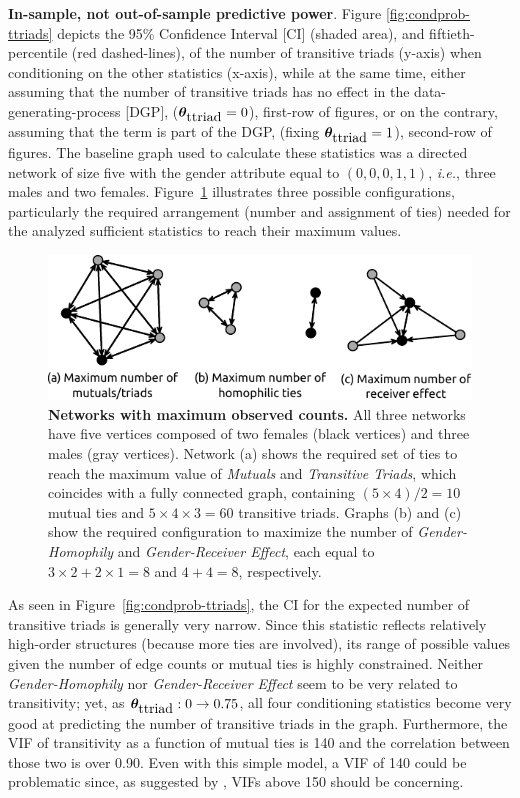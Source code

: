 \documentclass[12pt]{article}
\begin{document}
\noindent \textbf{In-sample, not out-of-sample predictive power}. Figure \ref{fig:condprob-ttriads} depicts the 95\% Confidence Interval [CI] (shaded area), and fiftieth-percentile (red dashed-lines), of the number of transitive triads (y-axis) when conditioning on the other statistics (x-axis), while at the same time, either assuming that the number of transitive triads has no effect in the data-generating-process [DGP], ($\bm{\theta}_{\mbox{ttriad}} = 0$), first-row of figures, or on the contrary, assuming that the term is part of the DGP, (fixing $\bm{\theta}_{\mbox{ttriad}}= 1$), second-row of figures. The baseline graph used to calculate these statistics was a directed network of size five with the gender attribute equal to $(0,0,0,1,1)$, \textit{i.e.}, three males and two females. Figure~\ref{fig:maxout-gof} illustrates three possible configurations, particularly the required arrangement (number and assignment of ties) needed for the analyzed sufficient statistics to reach their maximum values.

\begin{figure}[]
    \centering
    \includegraphics[width = .7\linewidth]{max-out-stats.pdf}
    \caption[Examples of Networks with the maximum observed counts]{\textbf{Networks with maximum observed counts.} All three networks have five vertices composed of two females (black vertices) and three males (gray vertices).
    Network (a) shows the required set of ties to reach the maximum value of \textit{Mutuals} and \textit{Transitive Triads}, which coincides with a fully connected graph, containing $(5\times 4)/2 = 10$ mutual ties and $5 \times 4 \times 3 = 60$ transitive triads.
    Graphs (b) and (c) show the required configuration to maximize the number of \textit{Gender-Homophily} and \textit{Gender-Receiver Effect}, each equal to $3\times 2 + 2\times 1 = 8$ and $4 + 4 = 8$, respectively.}
    \label{fig:maxout-gof}
\end{figure}

As seen in Figure~\ref{fig:condprob-ttriads}, the CI for the expected number of transitive triads is generally very narrow. Since this statistic reflects relatively high-order structures (because more ties are involved), its range of possible values given the number of edge counts or mutual ties is highly constrained. Neither \textit{Gender-Homophily} nor \textit{Gender-Receiver Effect} seem to be very related to transitivity; yet, as $\bm{\theta}_{\mbox{ttriad}}: 0\to 0.75$, all four conditioning statistics become very good at predicting the number of transitive triads in the graph. Furthermore, the VIF of transitivity as a function of mutual ties is 140 and the correlation between those two is over 0.90. Even with this simple model, a VIF of 140 could be problematic since, as suggested by \cite{duxburyDiagnosingMulticollinearityExponential2021}, VIFs above 150 should be concerning.
\end{document}
